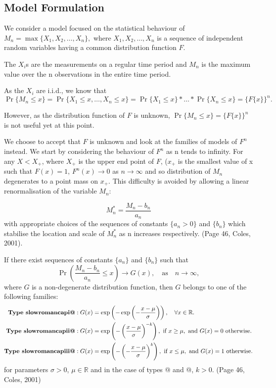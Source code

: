 \documentclass{article}
\makeatletter
\newcommand*{\rom}[1]{\expandafter\@slowromancap\romannumeral #1@}
\makeatother
\begin{document}
\subsection{Model Formulation}

We consider a model focused on the statistical behaviour of
$M_n=\max{\{X_1,X_2,\ldots,X_n\}},$ 
where  $X_1,X_2,\ldots,X_n$ is a sequence of independent random variables having a common
distribution function $F$.

The $X_i$s are the measurements on a regular time period and $M_n$ is the maximum value over the n observations in the entire time period.

As the $X_i$ are i.i.d., we know that
$$\Pr\{M_n\leqslant x\}=\Pr\{X_1\leqslant x,\ldots,X_n\leqslant x\}=\Pr\{X_1\leqslant x\}*\ldots*\Pr\{X_n\leqslant x\}=\{F\{x\}\}^{n}.$$

However, as the distribution function of $F$ is unknown, $\Pr\{M_n \leqslant x\}=\{F\{x\}\}^{n}$ is not useful yet at this point.

We choose to accept that $F$ is unknown and look at the families of models of $F^n$ instead. We start by considering the behaviour of $F^n$ as n tends to infinity. For any $X<X_+$, where $X_+$ is the upper end point of $F$, ($x_+$ is the smallest value of x such that $F(x)=1$, $F^{n} (x)\to 0$ as $n \to \infty$ and so distribution of $M_n$ degenerates to a point mass on $x_+$. This difficulty is avoided by allowing a linear renormalisation of the variable $M_n$: 

$$M_n^*=\frac{{M_n}-{b_n}}{a_n}$$ 
with appropriate choices of the sequences of constants $\{a_n>0\}$ and $\{b_n\}$ which stabilise the location and scale of $M_n^*$ as n increases respectively. (Page 46, Coles, 2001).

If there exist sequences of constants $\{a_n\}$ and $\{b_n\}$ such that $$\Pr\left(\frac{{M_n}-{b_n}}{a_n} \leqslant x\right) \to G(x), \quad \text{as} \quad n\to \infty,$$
where $G$ is a non-degenerate distribution function, then $G$ belongs to one of the following families:
\begin{align}
\textbf{Type \rom{1}}&: G(x) = \exp\left(-\exp\left(-\frac{x-\mu}{\sigma}\right)\right), \quad \forall x \in \mathbb{R}.\label{maingumble}\\
\textbf{Type \rom{2}}&: G(x) = \exp\left(-\left({\frac{x-\mu}{\sigma}}\right)^{-k}\right),\text{ if } x\geq \mu, \text{ and } G(x) = 0 \text{ otherwise.}\label{mainfrechet}\\
\textbf{Type \rom{3}}&: G(x) = \exp\left(-\left(-\frac{x-\mu}{\sigma}\right)^{k}\right),\text{ if } x\leq \mu, \text{ and } G(x)=1\text{ otherwise.}\label{mainweibull}
\end{align}
for parameters $\sigma>0$, $\mu \in \mathbb{R}$ and in the case of types \rom{2} and \rom{3}, $k>0$. (Page 46, Coles, 2001)
\end{document}
